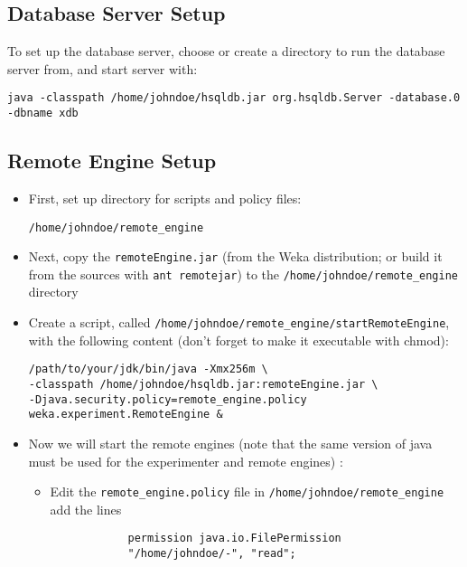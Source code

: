 \documentclass[a4paper]{article}
\begin{document}
\subsection{Database Server Setup}

To set up the database server, choose or create a directory to run the database server from, and start server with:

\begin{verbatim}
java -classpath /home/johndoe/hsqldb.jar org.hsqldb.Server -database.0 -dbname xdb
\end{verbatim}


\subsection{Remote Engine Setup}

\begin{itemize}
   \item First, set up directory for scripts and policy files: 

		\begin{verbatim}
/home/johndoe/remote_engine
		\end{verbatim}

   \item Next, copy the \texttt{remoteEngine.jar} (from the Weka distribution; or build it from the sources with \texttt{ant remotejar}) to the \texttt{/home/johndoe/remote\_engine} directory 

   \item Create a script, called \texttt{/home/johndoe/remote\_engine/startRemoteEngine}, with the following content (don't forget to make it executable with chmod): 
		\begin{verbatim}
/path/to/your/jdk/bin/java -Xmx256m \
-classpath /home/johndoe/hsqldb.jar:remoteEngine.jar \
-Djava.security.policy=remote_engine.policy weka.experiment.RemoteEngine &
		\end{verbatim}

   \item Now we will start the remote engines (note that the same version of java must be used for the experimenter and remote engines) :
   	\begin{itemize}
         \item Edit the \texttt{remote\_engine.policy} file in \texttt{/home/johndoe/remote\_engine} add the lines
				\begin{verbatim}
            permission java.io.FilePermission
            "/home/johndoe/-", "read";
            \end{verbatim}


\end{itemize}
\end{itemize}
\end{document}

